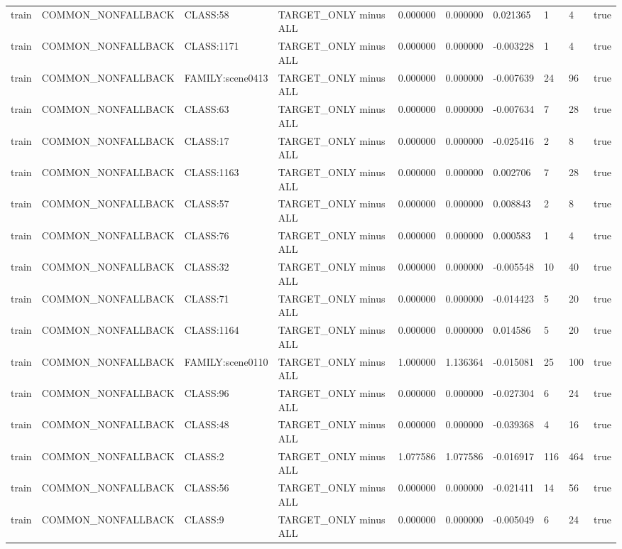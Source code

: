 \begin{tabular}{llllllllll}
train & COMMON\_NONFALLBACK & CLASS:58 & TARGET\_ONLY minus ALL & 0.000000 & 0.000000 & 0.021365 & 1 & 4 & true \\
train & COMMON\_NONFALLBACK & CLASS:1171 & TARGET\_ONLY minus ALL & 0.000000 & 0.000000 & -0.003228 & 1 & 4 & true \\
train & COMMON\_NONFALLBACK & FAMILY:scene0413 & TARGET\_ONLY minus ALL & 0.000000 & 0.000000 & -0.007639 & 24 & 96 & true \\
train & COMMON\_NONFALLBACK & CLASS:63 & TARGET\_ONLY minus ALL & 0.000000 & 0.000000 & -0.007634 & 7 & 28 & true \\
train & COMMON\_NONFALLBACK & CLASS:17 & TARGET\_ONLY minus ALL & 0.000000 & 0.000000 & -0.025416 & 2 & 8 & true \\
train & COMMON\_NONFALLBACK & CLASS:1163 & TARGET\_ONLY minus ALL & 0.000000 & 0.000000 & 0.002706 & 7 & 28 & true \\
train & COMMON\_NONFALLBACK & CLASS:57 & TARGET\_ONLY minus ALL & 0.000000 & 0.000000 & 0.008843 & 2 & 8 & true \\
train & COMMON\_NONFALLBACK & CLASS:76 & TARGET\_ONLY minus ALL & 0.000000 & 0.000000 & 0.000583 & 1 & 4 & true \\
train & COMMON\_NONFALLBACK & CLASS:32 & TARGET\_ONLY minus ALL & 0.000000 & 0.000000 & -0.005548 & 10 & 40 & true \\
train & COMMON\_NONFALLBACK & CLASS:71 & TARGET\_ONLY minus ALL & 0.000000 & 0.000000 & -0.014423 & 5 & 20 & true \\
train & COMMON\_NONFALLBACK & CLASS:1164 & TARGET\_ONLY minus ALL & 0.000000 & 0.000000 & 0.014586 & 5 & 20 & true \\
train & COMMON\_NONFALLBACK & FAMILY:scene0110 & TARGET\_ONLY minus ALL & 1.000000 & 1.136364 & -0.015081 & 25 & 100 & true \\
train & COMMON\_NONFALLBACK & CLASS:96 & TARGET\_ONLY minus ALL & 0.000000 & 0.000000 & -0.027304 & 6 & 24 & true \\
train & COMMON\_NONFALLBACK & CLASS:48 & TARGET\_ONLY minus ALL & 0.000000 & 0.000000 & -0.039368 & 4 & 16 & true \\
train & COMMON\_NONFALLBACK & CLASS:2 & TARGET\_ONLY minus ALL & 1.077586 & 1.077586 & -0.016917 & 116 & 464 & true \\
train & COMMON\_NONFALLBACK & CLASS:56 & TARGET\_ONLY minus ALL & 0.000000 & 0.000000 & -0.021411 & 14 & 56 & true \\
train & COMMON\_NONFALLBACK & CLASS:9 & TARGET\_ONLY minus ALL & 0.000000 & 0.000000 & -0.005049 & 6 & 24 & true \\

\end{tabular}
